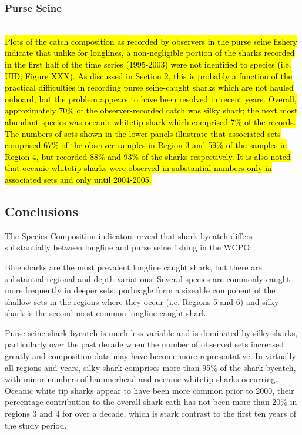 \documentclass[12pt]{SCreport}
\begin{document}
 \subsubsection{Purse Seine} 
 \\
\hl{ Plots of the catch composition as recorded by observers in the purse seine fishery indicate that unlike for longlines, a non-negligible portion of the sharks recorded in the first half of the time series (1995-2003) were not identified to species (i.e. UID; Figure XXX). As discussed in Section 2, this is probably a function of the practical difficulties in recording purse seine-caught sharks which are not hauled onboard, but the problem appears to have been resolved in recent years. Overall, approximately 70\% of the observer-recorded catch was silky shark; the next most abundant species was oceanic whitetip shark which comprised 7\% of the records. The numbers of sets shown in the lower panels illustrate that associated sets comprised 67\% of the observer samples in Region 3 and 59\% of the samples in Region 4, but recorded 88\% and 93\% of the sharks respectively. It is also noted that oceanic whitetip sharks were observed in substantial numbers only in associated sets and only until 2004-2005.}
 
 \subsection{Conclusions}

The Species Composition indicators reveal that shark bycatch differs substantially between longline and purse seine fishing in the WCPO.  

Blue sharks are the most prevalent longline caught shark, but there are substantial regional and depth variations.  Several species are commonly caught more frequently in deeper sets; porbeagle form a sizeable component of the shallow sets in the regions where they occur (i.e. Regions 5 and 6) and silky shark is the second most common longline caught shark.

Purse seine shark bycatch is much less variable and is dominated by silky sharks, particularly over the past decade when the number of observed sets increased greatly and composition data may have become more representative.  In virtually all regions and years, silky shark comprises more than 95\% of the shark bycatch, with minor numbers of hammerhead and oceanic whitetip sharks occurring.  Oceanic white tip sharks appear to have been more common prior to 2000, their percentage contribution to the overall shark cath has not been more than 20\% in regions 3 and 4 for over a decade, which is stark contrast to the first ten years of the study period. 
\end{document}
